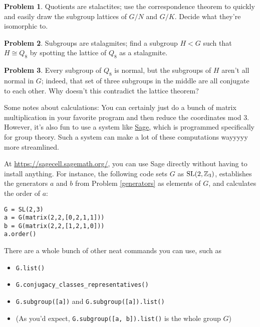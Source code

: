 \documentclass[12pt]{article}
\theoremstyle{definition} %
\newtheorem{problem}{Problem}
\begin{document}
\begin{problem}
  Quotients are stalactites; use the correspondence theorem to quickly and easily draw the subgroup lattices of $G/N$ and $G/K$. Decide what they're isomorphic to.
\end{problem}

\begin{problem}
  Subgroups are stalagmites; find a subgroup $H < G$ such that $H \cong Q_8$ by spotting the lattice of $Q_8$ as a stalagmite.
\end{problem}

\begin{problem}
  Every subgroup of $Q_8$ is normal, but the subgroups of $H$ aren't all normal in $G$; indeed, that set of three subgroups in the middle are all conjugate to each other. Why doesn't this contradict the lattice theorem?
\end{problem}

\hrulefill

\medskip

Some notes about calculations: You can certainly just do a bunch of matrix multiplication in your favorite program and then reduce the coordinates mod 3. However, it's also fun to use a system like \href{https://sagecell.sagemath.org/}{Sage}, which is programmed specifically for group theory. Such a system can make a lot of these computations wayyyyy more streamlined.

\medskip

At \href{https://sagecell.sagemath.org/}{https://sagecell.sagemath.org/}, you can use Sage directly without having to install anything. For instance, the following code sets $G$ as $\operatorname{SL}(2, \mathbb{Z}_3)$, establishes the generators $a$ and $b$ from Problem \ref{generators} as elements of $G$, and calculates the order of $a$:

\begin{verbatim}
G = SL(2,3)
a = G(matrix(2,2,[0,2,1,1]))
b = G(matrix(2,2,[1,2,1,0]))
a.order()
\end{verbatim}

There are a whole bunch of other neat commands you can use, such as
\begin{itemize}
  \item \verb|G.list()|
  \item \verb|G.conjugacy_classes_representatives()|
  \item \verb|G.subgroup([a])| and \verb|G.subgroup([a]).list()|
  \item (As you'd expect, \verb|G.subgroup([a, b]).list()| is the whole group $G$)
\end{itemize} 
\end{document}

